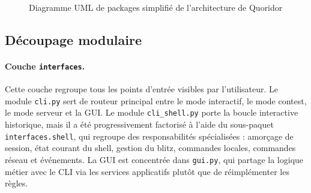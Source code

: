 \begin{figure}[!ht]
  \caption{Diagramme UML de packages simplifié de l'architecture de Quoridor}
  \label{fig:architecture-layered-overview}
\end{figure}

\subsection{Découpage modulaire}

\paragraph{Couche \texttt{interfaces}.}
Cette couche regroupe tous les points d'entrée visibles par l'utilisateur. Le
module \texttt{cli.py} sert de routeur principal entre le mode interactif, le
mode contest, le mode serveur et la GUI. Le module \texttt{cli\_shell.py}
porte la boucle interactive historique, mais il a été progressivement
factorisé à l'aide du sous-paquet \texttt{interfaces.shell}, qui regroupe des
responsabilités spécialisées : amorçage de session, état courant du shell,
gestion du blitz, commandes locales, commandes réseau et événements. La GUI
est concentrée dans \texttt{gui.py}, qui partage la logique métier avec le
CLI via les services applicatifs plutôt que de réimplémenter les règles.

